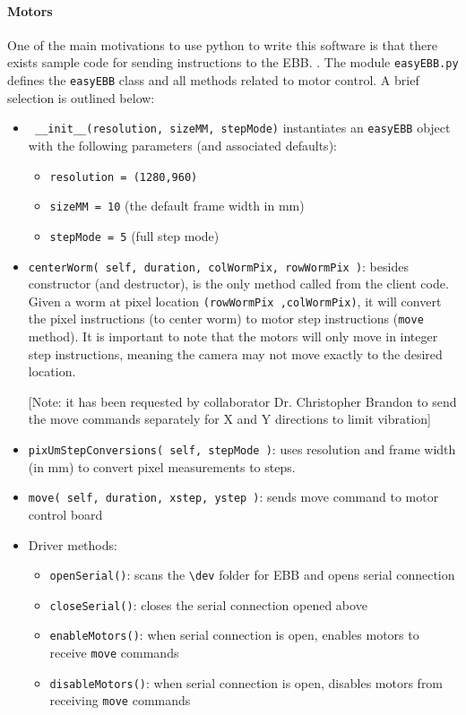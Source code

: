 \documentclass[main.tex]{subfiles}
\begin{document}
\paragraph{Motors}
One of the main motivations to use python to write this software is that there exists sample code for sending instructions to the EBB. \cite{EBBsite, EBBcode}. The module \verb|easyEBB.py| defines the \verb|easyEBB| class and all methods related to motor control. A brief selection is outlined below:
\begin{itemize}
\item \verb| __init__(resolution, sizeMM, stepMode)| instantiates an \verb|easyEBB| object with the following parameters (and associated defaults):
  \begin{itemize}
  \item \verb|resolution = (1280,960)|
    \item \verb|sizeMM = 10| (the default frame width in mm)
    \item \verb|stepMode = 5| (full step mode)
  \end{itemize}
\item \verb|centerWorm( self, duration, colWormPix, rowWormPix )|: besides constructor (and destructor), is the only method called from the client code. Given a worm at pixel location \verb|(rowWormPix ,colWormPix)|, it will convert the pixel instructions (to center worm) to motor step instructions (\verb|move| method). It is important to note that the motors will only move in integer step instructions, meaning the camera may not move exactly to the desired location.

[Note: it has been requested by collaborator Dr. Christopher Brandon to send the move commands separately for X and Y directions to limit vibration]  
\item \verb|pixUmStepConversions( self, stepMode )|: uses resolution and frame width (in mm) to convert pixel measurements to steps. 
\item \verb|move( self, duration, xstep, ystep )|: sends move command to motor control board

\item Driver methods:
  \begin{itemize}
  \item \verb|openSerial()|: scans the \verb|\dev| folder for EBB and opens serial connection
  \item \verb|closeSerial()|: closes the serial connection opened above
  \item \verb|enableMotors()|: when serial connection is open, enables motors to receive \verb|move| commands
  \item \verb|disableMotors()|: when serial connection is open, disables motors from receiving \verb|move| commands
  \end{itemize}
\end{itemize}
\end{document}
